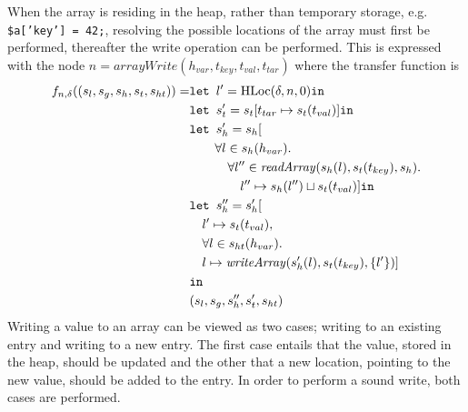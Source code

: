 When the array is residing in the heap, rather than temporary storage, e.g. \texttt{\$a['key'] = 42;}, resolving the possible locations of the array must first be performed, thereafter the write operation can be performed. This is expressed with the node $n = \mathit{arrayWrite}(h_{var}, t_{key},t_{val},t_{tar})$ where the transfer function is
\begin{align}
f_{n,\delta}((s_l, s_g, s_h, s_t, s_{ht})) = &\texttt{let } l' = \text{HLoc}(\delta, n, 0) \texttt{in } \notag\\
                            &\texttt{let } s_t' = s_t[t_{tar}\mapsto s_t(t_{val})] \texttt{in }\notag\\
                            &\texttt{let } s_h' =  s_h[\notag\\
                            &\quad\quad\forall l \in s_h(h_{var}).\notag\\
                            &\quad\quad\quad\forall l'' \in \mathit{readArray}(s_h(l), s_t(t_{key}), s_h).\notag\\
                            &\quad\quad\quad\quad l''\mapsto s_h(l'') \sqcup s_t(t_{val})] \texttt{in }\notag\\
                            &\texttt{let } s_h'' = s_h'[\notag\\
                            &\quad l' \mapsto s_t(t_{val}), \notag\\
                            &\quad \forall l \in s_{ht}(h_{var}).\notag\\
                            &\quad l\mapsto \mathit{writeArray}(s_h'(l), s_t(t_{key}), \{l'\})]\notag\\
                            & \texttt{in }\notag\\
                            &(s_l, s_g, s_h'', s_t', s_{ht})
\end{align}
Writing a value to an array can be viewed as two cases; writing to an existing entry and writing to a new entry. The first case entails that the value, stored in the heap, should be updated and the other that a new location, pointing to the new value, should be added to the entry. In order to perform a sound write, both cases are performed. 


